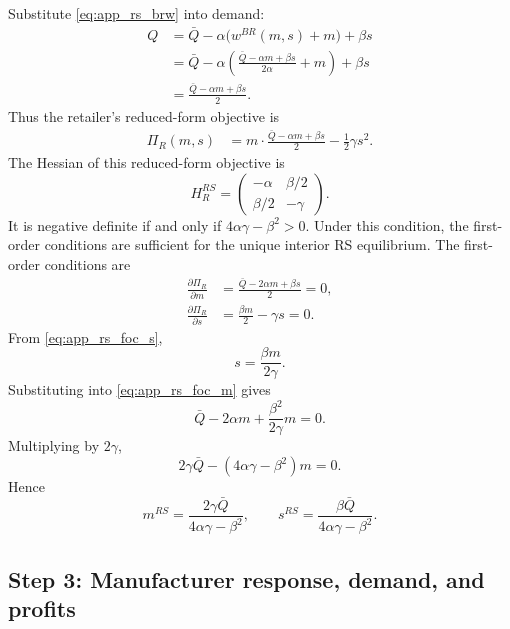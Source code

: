 Substitute \eqref{eq:app_rs_brw} into demand:
\begin{align}
 Q &= \bar Q-\alpha\bigl(w^{BR}(m,s)+m\bigr)+\beta s \\
   &= \bar Q-\alpha\left(\frac{\bar Q-\alpha m+\beta s}{2\alpha}+m\right)+\beta s \\
   &= \frac{\bar Q-\alpha m+\beta s}{2}.
 \label{eq:app_rs_reduced_demand}
\end{align}
Thus the retailer's reduced-form objective is
\begin{align}
 \Pi_R(m,s)
 &=m\cdot \frac{\bar Q-\alpha m+\beta s}{2}-\frac{1}{2}\gamma s^2.
 \label{eq:app_rs_reduced_obj}
\end{align}
The Hessian of this reduced-form objective is
\begin{equation}
 H_R^{RS}=
 \begin{pmatrix}
 -\alpha & \beta/2\\
 \beta/2 & -\gamma
 \end{pmatrix}.
\end{equation}
It is negative definite if and only if $4\alpha\gamma-\beta^2>0$. Under this
condition, the first-order conditions are sufficient for the unique interior RS
equilibrium.
The first-order conditions are
\begin{align}
 \frac{\partial \Pi_R}{\partial m}
 &=\frac{\bar Q-2\alpha m+\beta s}{2}=0,
 \label{eq:app_rs_foc_m}\\
 \frac{\partial \Pi_R}{\partial s}
 &=\frac{\beta m}{2}-\gamma s=0.
 \label{eq:app_rs_foc_s}
\end{align}
From \eqref{eq:app_rs_foc_s},
\begin{equation}
 s=\frac{\beta m}{2\gamma}.
 \label{eq:app_rs_s_of_m}
\end{equation}
Substituting into \eqref{eq:app_rs_foc_m} gives
\begin{equation}
 \bar Q-2\alpha m+\frac{\beta^2}{2\gamma}m=0.
\end{equation}
Multiplying by $2\gamma$,
\begin{equation}
 2\gamma\bar Q-(4\alpha\gamma-\beta^2)m=0.
\end{equation}
Hence
\begin{equation}
 m^{RS}=\frac{2\gamma\bar Q}{4\alpha\gamma-\beta^2},
 \qquad
 s^{RS}=\frac{\beta\bar Q}{4\alpha\gamma-\beta^2}.
\end{equation}

\subsection{Step 3: Manufacturer response, demand, and profits}

